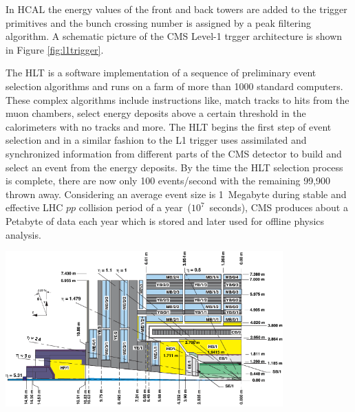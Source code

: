 \newline
In HCAL the energy values of the front and back towers are added to the trigger primitives and the bunch crossing  number is assigned by a peak filtering algorithm.  A schematic picture of the CMS  Level-1 trgger architecture is shown in Figure \ref{fig:l1trigger}.
\par
The HLT is a software implementation of a sequence of preliminary event selection algorithms and runs on a farm of more than 1000 standard computers. These complex algorithms include instructions like, match tracks to hits from the muon chambers, select energy deposits above a certain threshold in the calorimeters with no tracks and more. The HLT begins the first step of event selection and in a similar fashion to the L1 trigger uses assimilated and synchronized information from different parts of the CMS detector to build and select an event from the energy deposits. By the time the HLT selection process is complete, there are now only 100 events/second with the remaining 99,900 thrown away.  Considering an average event size is 1~Megabyte during stable and effective LHC $pp$ collision period of a year~($10^{7}$~seconds), CMS produces about a Petabyte of data each year which is stored and later used for offline physics analysis.

\vspace{5mm}
\begin{minipage}{0.99\textwidth} 
\begin{center}\label{CMS-SUBD}
\mbox{\includegraphics[height= 0.6\textwidth, width=0.8\textwidth]{THESISPLOTS/CMS_Int_View.png}} 
\label{fig:cmslview}
\end{center}
\end{minipage}


